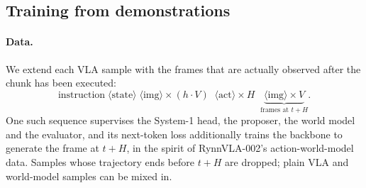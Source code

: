 \documentclass[11pt]{article}
\begin{document}
\subsection{Training from demonstrations}
\label{sec:training}

\paragraph{Data.} We extend each VLA sample with the frames that are actually observed after the chunk has been executed:
\begin{equation*}
\text{instruction}\;\langle\text{state}\rangle\;\langle\text{img}\rangle\times(h\cdot V)\;\;\langle\text{act}\rangle\times H\;\;\underbrace{\langle\text{img}\rangle\times V}_{\text{frames at } t+H}.
\end{equation*}
One such sequence supervises the System-1 head, the proposer, the world model and the evaluator, and its next-token loss additionally trains the backbone to generate the frame at $t+H$, in the spirit of RynnVLA-002's action-world-model data. Samples whose trajectory ends before $t+H$ are dropped; plain VLA and world-model samples can be mixed in.
\end{document}

